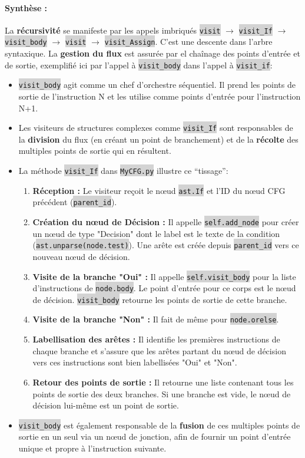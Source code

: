 \documentclass[11pt,a4paper]{article}
\newcommand{\code}[1]{\colorbox{lightgray}{\texttt{\small #1}}}
\begin{document}
\paragraph{Synthèse :}
La \textbf{récursivité} se manifeste par les appels imbriqués \code{visit} $\rightarrow$ \code{visit\_If} $\rightarrow$ \code{visit\_body} $\rightarrow$ \code{visit} $\rightarrow$ \code{visit\_Assign}. C'est une descente dans l'arbre syntaxique.
La \textbf{gestion du flux} est assurée par el chaînage des points d'entrée et de sortie, exemplifié ici par l'appel à \code{visit\_body} dans l'appel à \code{visit\_if}:
\begin{itemize}
    \item \code{visit\_body} agit comme un chef d'orchestre séquentiel. Il prend les points de sortie de l'instruction N et les utilise comme points d'entrée pour l'instruction N+1.
    \item Les visiteurs de structures complexes comme \code{visit\_If} sont responsables de la \textbf{division} du flux (en créant un point de branchement) et de la \textbf{récolte} des multiples points de sortie qui en résultent.\\
    \item La méthode \code{visit\_If} dans \code{MyCFG.py} illustre ce ``tissage'':
    \begin{enumerate}
        \item \textbf{Réception :} Le visiteur reçoit le nœud \code{ast.If} et l'ID du nœud CFG précédent (\code{parent\_id}).
        \item \textbf{Création du nœud de Décision :} Il appelle \code{self.add\_node} pour créer un nœud de type "Decision" dont le label est le texte de la condition (\code{ast.unparse(node.test)}). Une arête est créée depuis \code{parent\_id} vers ce nouveau nœud de décision.
        \item \textbf{Visite de la branche "Oui" :} Il appelle \code{self.visit\_body} pour la liste d'instructions de \code{node.body}. Le point d'entrée pour ce corps est le nœud de décision. \code{visit\_body} retourne les points de sortie de cette branche.
        \item \textbf{Visite de la branche "Non" :} Il fait de même pour \code{node.orelse}.
        \item \textbf{Labellisation des arêtes :} Il identifie les premières instructions de chaque branche et s'assure que les arêtes partant du nœud de décision vers ces instructions sont bien labellisées "Oui" et "Non".
        \item \textbf{Retour des points de sortie :} Il retourne une liste contenant tous les points de sortie des deux branches. Si une branche est vide, le nœud de décision lui-même est un point de sortie.
    \end{enumerate}
    \item \code{visit\_body} est également responsable de la \textbf{fusion} de ces multiples points de sortie en un seul via un nœud de jonction, afin de fournir un point d'entrée unique et propre à l'instruction suivante.
\end{itemize}
\end{document}
